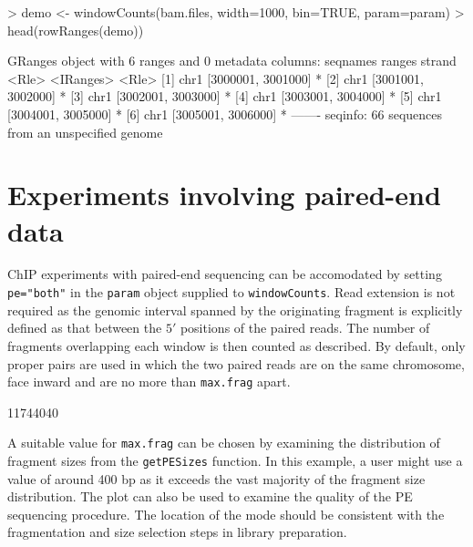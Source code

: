 \documentclass[12pt]{report}
\renewenvironment{Schunk}{\vspace{0pt}}{\vspace{0pt}}
\newcommand{\code}[1]{{\small\texttt{#1}}}
\begin{document}
\begin{Schunk}
\begin{Sinput}
> demo <- windowCounts(bam.files, width=1000, bin=TRUE, param=param)
> head(rowRanges(demo))
\end{Sinput}
\begin{Soutput}
GRanges object with 6 ranges and 0 metadata columns:
      seqnames             ranges strand
         <Rle>          <IRanges>  <Rle>
  [1]     chr1 [3000001, 3001000]      *
  [2]     chr1 [3001001, 3002000]      *
  [3]     chr1 [3002001, 3003000]      *
  [4]     chr1 [3003001, 3004000]      *
  [5]     chr1 [3004001, 3005000]      *
  [6]     chr1 [3005001, 3006000]      *
  -------
  seqinfo: 66 sequences from an unspecified genome
\end{Soutput}
\end{Schunk}

\section{Experiments involving paired-end data}
\label{data:pet}

ChIP experiments with paired-end sequencing can be accomodated by setting \code{pe="both"} in the \code{param} object supplied to \code{windowCounts}. 
Read extension is not required as the genomic interval spanned by the originating fragment is explicitly defined as that between the $5'$ positions of the paired reads.
The number of fragments overlapping each window is then counted as described. 
By default, only proper pairs are used in which the two paired reads are on the same chromosome, face inward and are no more than \code{max.frag} apart.

\begin{Schunk}
\begin{Soutput}
[1] 11744040
\end{Soutput}
\end{Schunk}

A suitable value for \code{max.frag} can be chosen by examining the distribution of fragment sizes from the \code{getPESizes} function. 
In this example, a user might use a value of around 400 bp as it exceeds the vast majority of the fragment size distribution. 
The plot can also be used to examine the quality of the PE sequencing procedure. 
The location of the mode should be consistent with the fragmentation and size selection steps in library preparation. 
\end{document}
